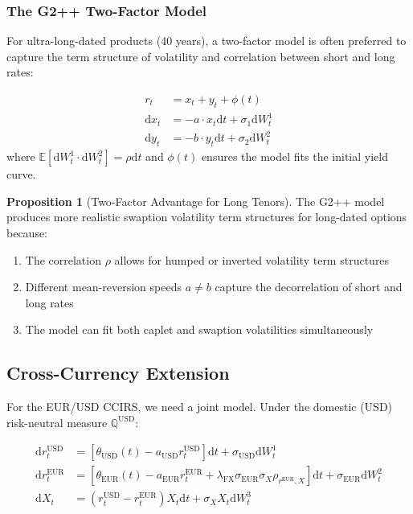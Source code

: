 \documentclass[11pt,a4paper]{article}
\theoremstyle{definition}
\newtheorem{proposition}{Proposition}[section]
\newcommand{\E}{\mathbb{E}}
\newcommand{\Q}{\mathbb{Q}}
\newcommand{\diff}{\mathrm{d}}
\begin{document}
\subsubsection{The G2++ Two-Factor Model}

For ultra-long-dated products (40 years), a two-factor model is often preferred to capture the term structure of volatility and correlation between short and long rates:

\begin{align}
r_t &= x_t + y_t + \phi(t) \\
\diff x_t &= -a \cdot x_t \diff t + \sigma_1 \diff W^1_t \\
\diff y_t &= -b \cdot y_t \diff t + \sigma_2 \diff W^2_t
\end{align}
where $\E[\diff W^1_t \cdot \diff W^2_t] = \rho \diff t$ and $\phi(t)$ ensures the model fits the initial yield curve.

\begin{proposition}[Two-Factor Advantage for Long Tenors]
The G2++ model produces more realistic swaption volatility term structures for long-dated options because:
\begin{enumerate}
    \item The correlation $\rho$ allows for humped or inverted volatility term structures
    \item Different mean-reversion speeds $a \neq b$ capture the decorrelation of short and long rates
    \item The model can fit both caplet and swaption volatilities simultaneously
\end{enumerate}
\end{proposition}

\subsection{Cross-Currency Extension}

For the EUR/USD CCIRS, we need a joint model. Under the domestic (USD) risk-neutral measure $\Q^{\text{USD}}$:

\begin{align}
\diff r^{\text{USD}}_t &= [\theta_{\text{USD}}(t) - a_{\text{USD}} r^{\text{USD}}_t] \diff t + \sigma_{\text{USD}} \diff W^{1}_t \\
\diff r^{\text{EUR}}_t &= [\theta_{\text{EUR}}(t) - a_{\text{EUR}} r^{\text{EUR}}_t + \lambda_{\text{FX}} \sigma_{\text{EUR}} \sigma_X \rho_{r^{\text{EUR}},X}] \diff t + \sigma_{\text{EUR}} \diff W^{2}_t \\
\diff X_t &= (r^{\text{USD}}_t - r^{\text{EUR}}_t) X_t \diff t + \sigma_X X_t \diff W^{3}_t
\end{align}
\end{document}
